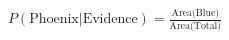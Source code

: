 \documentclass[preview]{standalone}
\begin{document}
\begin{align*}
P(\text{Phoenix} | \text{Evidence}) = \frac{\text{Area(Blue)}}{\text{Area(Total)}}
\end{align*}
\end{document}
